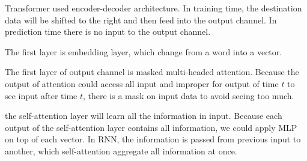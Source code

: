 Transformer used encoder-decoder architecture. In training time, the destination data will be shifted to the right and then feed into the output channel. In prediction time there is no input to the output channel.

The first layer is embedding layer, which change from a word into a vector.

The first layer of output channel is masked multi-headed attention. Because the output of attention could access all input and improper for output of time $t$ to see input after time $t$, there is a mask on input data to avoid seeing too much.

the self-attention layer will learn all the information in input. Because each output of the self-attention layer contains all information, we could apply MLP on top of each vector. In RNN, the information is passed from previous input to another, which self-attention aggregate all information at once.


